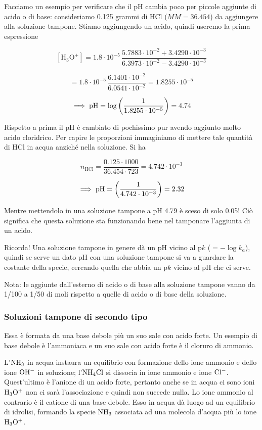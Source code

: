 Facciamo un esempio per verificare che il pH cambia poco per piccole aggiunte di acido o di base: consideriamo 0.125 grammi di HCl ($MM=36.454$) da aggiungere alla soluzione tampone. Stiamo aggiungendo un acido, quindi useremo la prima espressione

$${[\text{H}_3\text{O}^+]}=1.8 \cdot 10^{-5}\,\frac{5.7883 \cdot 10^{-2} + 3.4290\cdot 10^{-3}}{6.3973 \cdot 10^{-2} - 3.4290 \cdot 10^{-3}}$$

$$=1.8 \cdot 10^{-5}\,\frac{6.1401 \cdot 10^{-2}}{6.0541 \cdot 10^{-2}}
=1.8255 \cdot 10^{-5}$$

$$\implies \rm pH=\log \left( \frac{1}{1.8255 \cdot 10^{-5}} \right)=4.74$$

Rispetto a prima il pH è cambiato di pochissimo pur avendo aggiunto molto acido cloridrico. Per capire le proporzioni immaginiamo di mettere tale quantità di HCl in acqua anziché nella soluzione. Si ha 

$$n_{\text{HCl}}=\frac{0.125 \cdot 1000}{36.454 \cdot 723}
=4.742 \cdot 10^{-3}$$

$$\implies \rm pH=\left( \frac{1}{4.742 \cdot 10^{-3}} \right)=2.32$$

Mentre mettendolo in una soluzione tampone a pH 4.79 è sceso di solo 0.05! Ciò significa che questa soluzione sta funzionando bene nel tamponare l'aggiunta di un acido.

\vspace{0.2cm}Ricorda! Una soluzione tampone in genere dà un pH vicino al p$k$ ($=-\log{k_a}$), quindi se serve un dato pH con una soluzione tampone si va a guardare la costante della specie, cercando quella che abbia un p$k$ vicino al pH che ci serve.

Nota: le aggiunte dall'esterno di acido o di base alla soluzione tampone vanno da 1/100 a 1/50 di moli rispetto a quelle di acido o di base della soluzione.

\subsubsection{Soluzioni tampone di secondo tipo}
Essa è formata da una base debole più un suo sale con acido forte. Un esempio di base debole è l'ammoniaca e un suo sale con acido forte è il cloruro di ammonio.

L'$\rm NH_3$ in acqua instaura un equilibrio con formazione dello ione ammonio e dello ione $\rm OH^-$ in soluzione; l'$\rm NH_4Cl$ si dissocia in ione ammonio e ione $\rm Cl^-$. Quest'ultimo è l'anione di un acido forte, pertanto anche se in acqua ci sono ioni $\rm H_3O^+$ non ci sarà l'associazione e quindi non succede nulla. Lo ione ammonio al contrario è il catione di una base debole. Esso in acqua dà luogo ad un equilibrio di idrolisi, formando la specie $\rm NH_3$ associata ad una molecola d'acqua più lo ione $\rm H_3O^+$.

